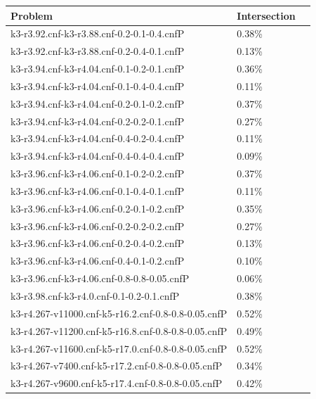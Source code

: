 \documentclass[12pt,a4paper,twoside]{scrartcl}
\numberwithin{equation}{section}
\begin{document}
\begin{table}[H]
\label{tab:combine small} 
\begin{center}
    \begin{tabular}{|l|l|p{1cm}|}
\hline 
Problem &Intersection \\ \hline
k3-r3.92.cnf-k3-r3.88.cnf-0.2-0.1-0.4.cnfP&	0.38\%	\\   \hline
 k3-r3.92.cnf-k3-r3.88.cnf-0.2-0.4-0.1.cnfP&	0.13\%	\\   \hline
 k3-r3.94.cnf-k3-r4.04.cnf-0.1-0.2-0.1.cnfP&	0.36\%	\\   \hline
 k3-r3.94.cnf-k3-r4.04.cnf-0.1-0.4-0.4.cnfP&	0.11\%	\\   \hline
 k3-r3.94.cnf-k3-r4.04.cnf-0.2-0.1-0.2.cnfP&	0.37\%	\\   \hline
 k3-r3.94.cnf-k3-r4.04.cnf-0.2-0.2-0.1.cnfP&	0.27\%	\\   \hline
 k3-r3.94.cnf-k3-r4.04.cnf-0.4-0.2-0.4.cnfP&	0.11\%	\\   \hline
 k3-r3.94.cnf-k3-r4.04.cnf-0.4-0.4-0.4.cnfP&	0.09\%	\\   \hline
 k3-r3.96.cnf-k3-r4.06.cnf-0.1-0.2-0.2.cnfP&	0.37\%	\\   \hline
 k3-r3.96.cnf-k3-r4.06.cnf-0.1-0.4-0.1.cnfP&	0.11\%	\\   \hline
 k3-r3.96.cnf-k3-r4.06.cnf-0.2-0.1-0.2.cnfP&	0.35\%	\\   \hline
 k3-r3.96.cnf-k3-r4.06.cnf-0.2-0.2-0.2.cnfP&	0.27\%	\\   \hline
 k3-r3.96.cnf-k3-r4.06.cnf-0.2-0.4-0.2.cnfP&	0.13\%	\\   \hline
 k3-r3.96.cnf-k3-r4.06.cnf-0.4-0.1-0.2.cnfP&	0.10\%	\\   \hline
 k3-r3.96.cnf-k3-r4.06.cnf-0.8-0.8-0.05.cnfP&	0.06\%	\\   \hline
 k3-r3.98.cnf-k3-r4.0.cnf-0.1-0.2-0.1.cnfP&	0.38\%	\\   \hline
 k3-r4.267-v11000.cnf-k5-r16.2.cnf-0.8-0.8-0.05.cnfP&	0.52\%	\\   \hline
 k3-r4.267-v11200.cnf-k5-r16.8.cnf-0.8-0.8-0.05.cnfP&	0.49\%	\\   \hline
 k3-r4.267-v11600.cnf-k5-r17.0.cnf-0.8-0.8-0.05.cnfP&	0.52\%	\\   \hline
 k3-r4.267-v7400.cnf-k5-r17.2.cnf-0.8-0.8-0.05.cnfP&	0.34\%	\\   \hline
 k3-r4.267-v9600.cnf-k5-r17.4.cnf-0.8-0.8-0.05.cnfP&	0.42\%	\\   \hline

\end{tabular}
\end{center}
\end{table}
\end{document}
